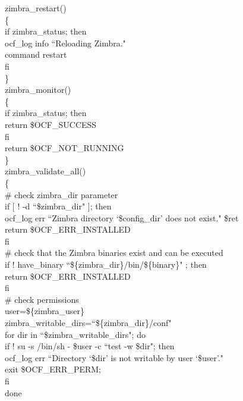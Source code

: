 \documentclass[a4paper, 12pt]{book}
\begin{document}
\noindent zimbra\_restart()\\
\{\\
    \indent if zimbra\_status; then\\
        \indent \indent ocf\_log info ``Reloading Zimbra."\\
        \indent \indent command restart\\
    \indent fi\\
\}\\

\noindent zimbra\_monitor()\\
\{\\
    \indent if zimbra\_status; then\\
        \indent \indent return \$OCF\_SUCCESS\\
    \indent fi\\
    \indent return \$OCF\_NOT\_RUNNING\\
\}\\

\noindent zimbra\_validate\_all()\\
\{\\
    \indent \# check zimbra\_dir parameter\\
    \indent if [ ! -d ``\$zimbra\_dir" ]; then\\
      \indent \indent ocf\_log err ``Zimbra directory `\$config\_dir' does not exist." \$ret\\
      \indent \indent return \$OCF\_ERR\_INSTALLED\\
    \indent fi\\
    \indent \# check that the Zimbra binaries exist and can be executed\\
    \indent if ! have\_binary ``\$\{zimbra\_dir\}/bin/\$\{binary\}" ; then\\
      \indent \indent return \$OCF\_ERR\_INSTALLED\\
    \indent fi\\

    \indent \# check permissions\\
    \indent user=\$\{zimbra\_user\}\\
    \indent zimbra\_writable\_dirs=``\$\{zimbra\_dir\}/conf"\\
    \indent for dir in ``\$zimbra\_writable\_dirs"; do\\
        \indent \indent if ! su -s /bin/sh - \$user -c ``test -w \$dir"; then\\
            \indent \indent \indent ocf\_log err ``Directory `\$dir' is not writable by user `\$user'."\\
            \indent \indent \indent exit \$OCF\_ERR\_PERM;\\
        \indent \indent fi\\
    \indent done\\
\end{document}
